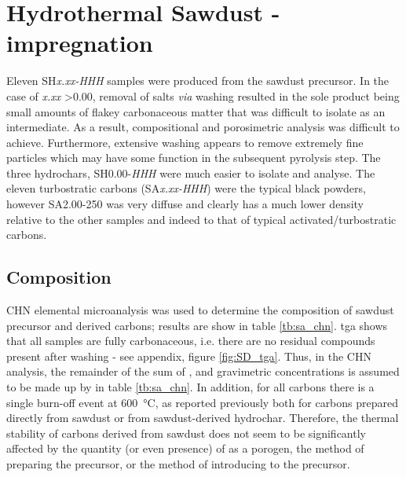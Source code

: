\newpage

\section[Hydrothermal Sawdust KOH-impregnation]{Hydrothermal Sawdust -impregnation}
\label{ss:sd_results}

Eleven SH\textit{x.xx-HHH} samples were produced from the sawdust precursor. In the case of \textit{x.xx} \num{>0.00}, removal of  salts \textit{via} washing resulted in the sole product being small amounts of flakey carbonaceous matter that was difficult to isolate as an intermediate. As a result, compositional and porosimetric analysis was difficult to achieve. Furthermore, extensive washing appears to remove extremely fine particles which may have some function in the subsequent pyrolysis step. The three \glspl{hydrochar}, SH0.00-\textit{HHH} were much easier to isolate and analyse. The eleven \glspl{turbostratic carbon} (SA\textit{x.xx-HHH}) were the typical black powders, however SA2.00-250 was very diffuse and clearly has a much lower density relative to the other samples and indeed to that of typical activated/\glspl{turbostratic carbon}.

\subsection{Composition}

CHN elemental microanalysis was used to determine the composition of sawdust precursor and derived carbons; results are show in table \ref{tb:sa_chn}. \acrshort{tga} shows that all samples are fully carbonaceous, i.e. there are no residual  compounds present after washing - see appendix, figure \ref{fig:SD_tga}. Thus, in the CHN analysis, the remainder of the sum of ,  and  gravimetric concentrations is assumed to be made up by  in table \ref{tb:sa_chn}. In addition, for all carbons there is a single burn-off event at \qty{600}{\degreeCelsius}, as reported previously both for carbons prepared directly from sawdust or from sawdust-derived \gls{hydrochar}.\citep{Balahmar2017Biomass} Therefore, the thermal stability of carbons derived from sawdust does not seem to be significantly affected by the quantity (or even presence) of  as a \gls{porogen}, the method of preparing the precursor, or the method of introducing  to the precursor.

